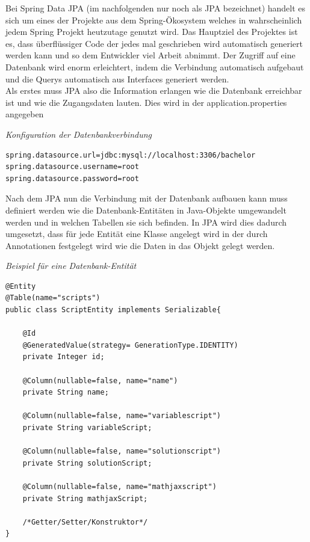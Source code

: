 Bei Spring Data JPA (im nachfolgenden nur noch als JPA bezeichnet) handelt es sich um eines der Projekte aus dem Spring-Ökosystem welches in wahrscheinlich jedem Spring Projekt heutzutage genutzt wird. Das Hauptziel des Projektes ist es, dass überflüssiger Code der jedes mal geschrieben wird automatisch generiert werden kann und so dem Entwickler viel Arbeit abnimmt. Der Zugriff auf eine Datenbank wird enorm erleichtert, indem die Verbindung automatisch aufgebaut und die Querys automatisch aus Interfaces generiert werden. \\
Als erstes muss JPA also die Information erlangen wie die Datenbank erreichbar ist und wie die Zugangsdaten lauten. Dies wird in der application.properties angegeben \\

\begin{minipage}{\textwidth}
\emph{Konfiguration der Datenbankverbindung}
\begin{lstlisting}
spring.datasource.url=jdbc:mysql://localhost:3306/bachelor
spring.datasource.username=root
spring.datasource.password=root
\end{lstlisting} 
\end{minipage}

Nach dem JPA nun die Verbindung mit der Datenbank aufbauen kann muss definiert werden wie die Datenbank-Entitäten in Java-Objekte umgewandelt werden und in welchen Tabellen sie sich befinden. In JPA wird dies dadurch umgesetzt, dass für jede Entität eine Klasse angelegt wird in der durch Annotationen festgelegt wird wie die Daten in das Objekt gelegt werden. \\

\begin{minipage}{\textwidth}
\emph{Beispiel für eine Datenbank-Entität}
\begin{lstlisting}
@Entity
@Table(name="scripts")
public class ScriptEntity implements Serializable{

	@Id
	@GeneratedValue(strategy= GenerationType.IDENTITY)
	private Integer id;
	
	@Column(nullable=false, name="name")
	private String name;
	
	@Column(nullable=false, name="variablescript")
	private String variableScript;
	
	@Column(nullable=false, name="solutionscript")
	private String solutionScript;

	@Column(nullable=false, name="mathjaxscript")
	private String mathjaxScript;
	
	/*Getter/Setter/Konstruktor*/
}
\end{lstlisting}
\end{minipage}

